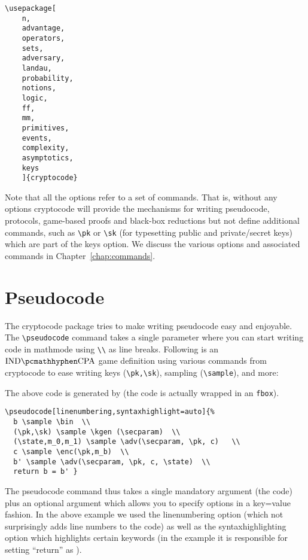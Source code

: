 \documentclass[a4paper]{report}
\begin{document}
\begin{lstlisting}
\usepackage[
	n,
	advantage,
	operators,
	sets,
	adversary,
	landau,
	probability,
	notions,
	logic,
	ff,
	mm,
	primitives,
	events,
	complexity,
	asymptotics,
	keys
	]{cryptocode}
\end{lstlisting}

Note that all the options refer to a set of commands. That is, without any options cryptocode will provide the mechanisms
for writing pseudocode, protocols, game-based proofs and black-box reductions but not define additional commands,
such as \lstinline$\pk$ or \lstinline$\sk$ (for typesetting public and private/secret keys) which are part of the keys option.
We discuss the various options and associated commands in Chapter~\ref{chap:commands}.


\section{Pseudocode}
The cryptocode package tries to make writing pseudocode easy and enjoyable. The
\lstinline$\pseudocode$ command takes a single parameter where you can start writing
code in mathmode using \lstinline{\\} as line breaks. Following is an $\indcpa$ game
definition using various commands from cryptocode to ease writing keys (\lstinline{\pk,\sk}),
sampling (\lstinline{\sample}), and more:
\begin{center}
\end{center}


The above code is generated by (the code is actually wrapped in an \lstinline$fbox$).
\begin{lstlisting}
\pseudocode[linenumbering,syntaxhighlight=auto]{%
  b \sample \bin  \\
  (\pk,\sk) \sample \kgen (\secparam)  \\
  (\state,m_0,m_1) \sample \adv(\secparam, \pk, c)   \\
  c \sample \enc(\pk,m_b)  \\
  b' \sample \adv(\secparam, \pk, c, \state)  \\
  return b = b' }
\end{lstlisting}
The pseudocode command thus takes a single mandatory argument (the code) plus an optional argument
which allows you to specify options in a key=value fashion. In the above example we used the linenumbering
option (which not surprisingly adds line numbers to the code) as well as the syntaxhighlighting option which
highlights certain keywords (in the example it is responsible for setting \enquote{return} as ).
\end{document}
